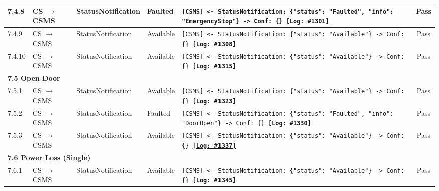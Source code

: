 \documentclass[10pt, a4paper, landscape]{article}
\begin{document}
\begin{longtable}{|p{1.0cm}|p{2.5cm}|p{4.0cm}|p{5.0cm}|p{10.0cm}|c|}
\hline
7.4.8 & CS $\to$ CSMS & StatusNotification & Faulted & \footnotesize\texttt{[CSMS] <- StatusNotification: \{"status": "Faulted", "info": "EmergencyStop"\} \newline [CSMS] -> Conf: \{\} \newline \hyperref[log:7.4.8]{\textbf{[Log: \#1301]}}} & Pass \\
\hline
7.4.9 & CS $\to$ CSMS & StatusNotification & Available & \footnotesize\texttt{[CSMS] <- StatusNotification: \{"status": "Available"\} \newline [CSMS] -> Conf: \{\} \newline \hyperref[log:7.4.9]{\textbf{[Log: \#1308]}}} & Pass \\
\hline
7.4.10 & CS $\to$ CSMS & StatusNotification & Available & \footnotesize\texttt{[CSMS] <- StatusNotification: \{"status": "Available"\} \newline [CSMS] -> Conf: \{\} \newline \hyperref[log:7.4.10]{\textbf{[Log: \#1315]}}} & Pass \\
\hline
\multicolumn{6}{|l|}{\textbf{7.5 Open Door}} \\
\hline
7.5.1 & CS $\to$ CSMS & StatusNotification & Available & \footnotesize\texttt{[CSMS] <- StatusNotification: \{"status": "Available"\} \newline [CSMS] -> Conf: \{\} \newline \hyperref[log:7.5.1]{\textbf{[Log: \#1323]}}} & Pass \\
\hline
7.5.2 & CS $\to$ CSMS & StatusNotification & Faulted & \footnotesize\texttt{[CSMS] <- StatusNotification: \{"status": "Faulted", "info": "DoorOpen"\} \newline [CSMS] -> Conf: \{\} \newline \hyperref[log:7.5.2]{\textbf{[Log: \#1330]}}} & Pass \\
\hline
7.5.3 & CS $\to$ CSMS & StatusNotification & Available & \footnotesize\texttt{[CSMS] <- StatusNotification: \{"status": "Available"\} \newline [CSMS] -> Conf: \{\} \newline \hyperref[log:7.5.3]{\textbf{[Log: \#1337]}}} & Pass \\
\hline
\multicolumn{6}{|l|}{\textbf{7.6 Power Loss (Single)}} \\
\hline
7.6.1 & CS $\to$ CSMS & StatusNotification & Available & \footnotesize\texttt{[CSMS] <- StatusNotification: \{"status": "Available"\} \newline [CSMS] -> Conf: \{\} \newline \hyperref[log:7.6.1]{\textbf{[Log: \#1345]}}} & Pass \\

\end{longtable}
\end{document}
